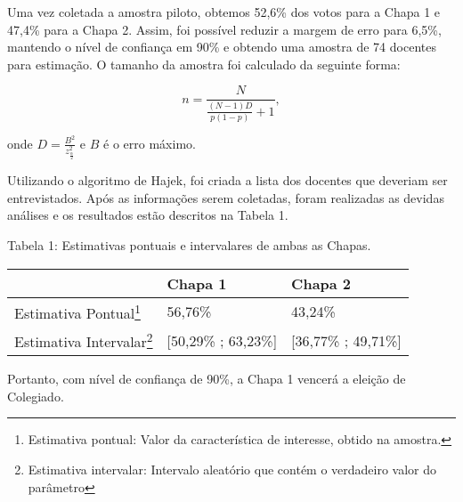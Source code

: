\documentclass[12pt,a4paper]{article}
\let\rmarkdownfootnote\footnote%
\def\footnote{\protect\rmarkdownfootnote}
\begin{document}
Uma vez coletada a amostra piloto, obtemos 52,6\% dos votos para a Chapa
1 e 47,4\% para a Chapa 2. Assim, foi possível reduzir a margem de erro
para 6,5\%, mantendo o nível de confiança em 90\% e obtendo uma amostra
de 74 docentes para estimação. O tamanho da amostra foi calculado da
seguinte forma:

\[n = \frac{N}{ \frac{(N-1)D}{p(1-p)} +1 },\]

\noindent onde \(D = \frac{B^2}{z^2_{ \frac{\alpha}{2} }}\) e \(B\) é o
erro máximo.

Utilizando o algoritmo de Hajek, foi criada a lista dos docentes que
deveriam ser entrevistados. Após as informações serem coletadas, foram
realizadas as devidas análises e os resultados estão descritos na Tabela
1.

\newpage

\begin{center}
Tabela 1: Estimativas pontuais e intervalares de ambas as Chapas.
\end{center}

\begin{longtable}[]{@{}lll@{}}
\toprule
& Chapa 1 & Chapa 2\tabularnewline
\midrule
\endhead
Estimativa
Pontual\footnote{Estimativa pontual: Valor da característica de interesse, obtido na amostra.}
& 56,76\% & 43,24\%\tabularnewline
Estimativa
Intervalar\footnote{Estimativa intervalar: Intervalo aleatório que contém o verdadeiro valor do parâmetro}
& {[}50,29\% ; 63,23\%{]} & {[}36,77\% ; 49,71\%{]}\tabularnewline
\bottomrule
\end{longtable}

Portanto, com nível de confiança de 90\%, a Chapa 1 vencerá a eleição de
Colegiado.
\end{document}
